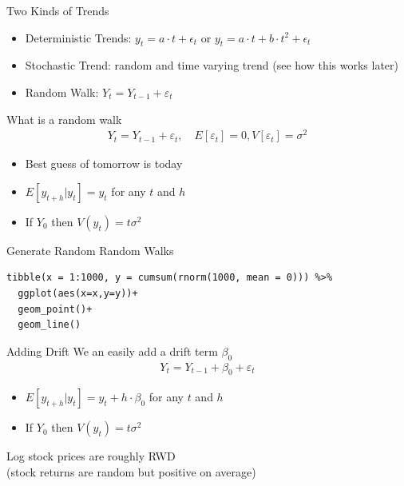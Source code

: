\begin{frame}{Two Kinds of Trends}
\begin{itemize}
\item Deterministic Trends: $y_t = a\cdot t + \epsilon_t$ or $y_t = a\cdot t + b \cdot t^2 + \epsilon_t$
\item Stochastic Trend: random and time varying trend (see how this works later)
\item Random Walk: $Y_t = Y_{t-1} + \varepsilon_t$
\end{itemize}
\end{frame}

\begin{frame}{What is a random walk}
\begin{align*}
Y_t = Y_{t-1} + \varepsilon_t, \quad E[\varepsilon_t] = 0, V[\varepsilon_t] = \sigma^2
\end{align*}
\begin{itemize}
\item Best guess of tomorrow is today
\item $E[y_{t+h} | y_t] = y_t$ for any $t$ and $h$
\item If $Y_0$ then $V(y_t) = t \sigma^2$
\end{itemize}
\end{frame}


\begin{frame}[fragile]{Generate Random Random Walks}
\begin{verbatim}
tibble(x = 1:1000, y = cumsum(rnorm(1000, mean = 0))) %>% 
  ggplot(aes(x=x,y=y))+
  geom_point()+
  geom_line()
\end{verbatim}
\end{frame}

\begin{frame}{Adding Drift}
We an easily add a drift term $\beta_0$
\begin{align*}
Y_t = Y_{t-1} + \beta_0 + \varepsilon_t
\end{align*}
\begin{itemize}
\item $E[y_{t+h} | y_t] = y_t + h\cdot \beta_0$ for any $t$ and $h$
\item If $Y_0$ then $V(y_t) = t \sigma^2$
\end{itemize}
Log stock prices are roughly RWD\\
(stock returns are random but positive on average)
\end{frame}

